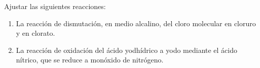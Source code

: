 Ajustar las siguientes reacciones:
\begin{enumerate}[label={\alph*)},font={\color{red!50!black}\bfseries}]
    \item La reacción de dismutación, en medio alcalino, del cloro molecular en cloruro y en clorato.
    \item La reacción de oxidación del ácido yodhídrico a yodo mediante el ácido nítrico, que se reduce a monóxido de nitrógeno.
\end{enumerate}
